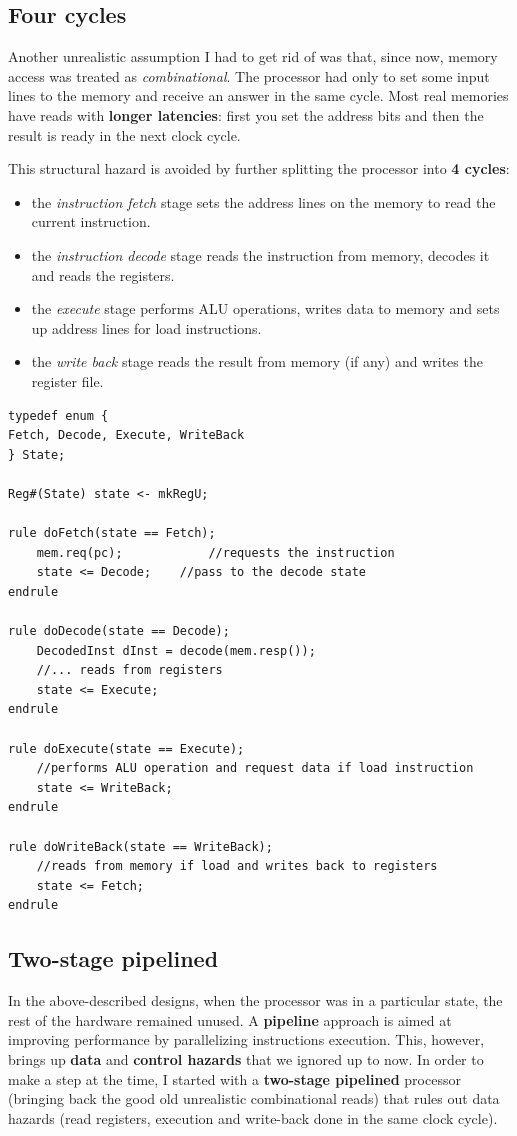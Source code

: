 \documentclass[12pt,oneside,a4paper]{article}
\begin{document}
\subsection{Four cycles}
Another unrealistic assumption I had to get rid of was that, since now, memory access was treated as \textit{combinational}. The processor had only to set some input lines to the memory and receive an answer in the same cycle. Most real memories have reads with \textbf{longer latencies}: first you set the address bits and then the result is ready in the next clock cycle.

This structural hazard is avoided by further splitting the processor into \textbf{4 cycles}:
\begin{itemize}
	\item the \textit{instruction fetch} stage sets the address lines on the memory to read the current instruction.
	\item the \textit{instruction decode} stage reads the instruction from memory, decodes it and reads the registers.
	\item the \textit{execute} stage performs ALU operations, writes data to memory and sets up address lines for load instructions.
	\item the \textit{write back} stage reads the result from memory (if any) and writes the register file.
\end{itemize}

\begin{lstlisting}[label={fourcyclecode},caption={Four cycle processor simplified code}]
typedef enum {
Fetch, Decode, Execute, WriteBack
} State;

Reg#(State) state <- mkRegU;

rule doFetch(state == Fetch);      
	mem.req(pc);			//requests the instruction
	state <= Decode;	//pass to the decode state
endrule

rule doDecode(state == Decode);
	DecodedInst dInst = decode(mem.resp());
	//... reads from registers
	state <= Execute;
endrule

rule doExecute(state == Execute);
	//performs ALU operation and request data if load instruction
	state <= WriteBack;
endrule

rule doWriteBack(state == WriteBack);
	//reads from memory if load and writes back to registers
	state <= Fetch;
endrule
\end{lstlisting}

\subsection{Two-stage pipelined}
In the above-described designs, when the processor was in a particular state, the rest of the hardware remained unused. A \textbf{pipeline} approach is aimed at improving performance by parallelizing instructions execution. This, however, brings up \textbf{data} and \textbf{control hazards} that we ignored up to now. In order to make a step at the time, I started with a \textbf{two-stage pipelined} processor (bringing back the good old unrealistic combinational reads) that rules out data hazards (read registers, execution and write-back done in the same clock cycle).\\
\end{document}
